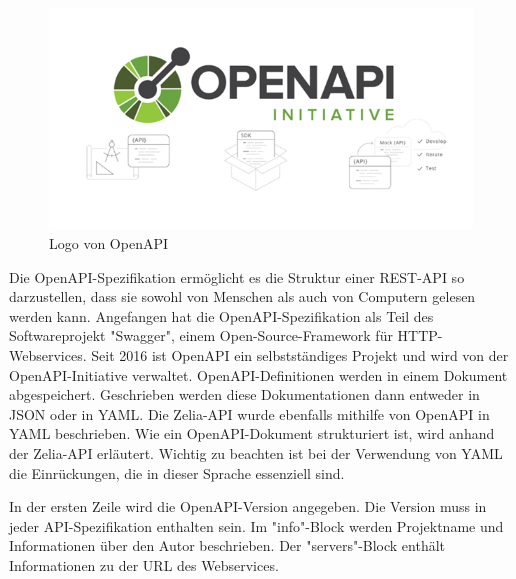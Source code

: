 \begin{figure}
    \includegraphics{media/OpenAPI/Logo.png}
    \centering
    \caption{Logo von OpenAPI}
\end{figure}

Die OpenAPI-Spezifikation ermöglicht es die Struktur einer REST-API so darzustellen, dass sie sowohl von Menschen als auch von Computern gelesen werden kann. Angefangen hat die OpenAPI-Spezifikation als Teil des Softwareprojekt "Swagger", einem Open-Source-Framework für HTTP-Webservices. Seit 2016 ist OpenAPI ein selbstständiges Projekt und wird von der OpenAPI-Initiative verwaltet. OpenAPI-Definitionen werden in einem Dokument abgespeichert. Geschrieben werden diese Dokumentationen dann entweder in JSON oder in YAML. Die Zelia-API wurde ebenfalls mithilfe von OpenAPI in YAML beschrieben. Wie ein OpenAPI-Dokument strukturiert ist, wird anhand der Zelia-API erläutert. Wichtig zu beachten ist bei der Verwendung von YAML die Einrückungen, die in dieser Sprache essenziell sind.


In der ersten Zeile wird die OpenAPI-Version angegeben. Die Version muss in jeder API-Spezifikation enthalten sein. Im "info"-Block werden Projektname und Informationen über den Autor beschrieben. Der "servers"-Block enthält Informationen zu der URL des Webservices. 


